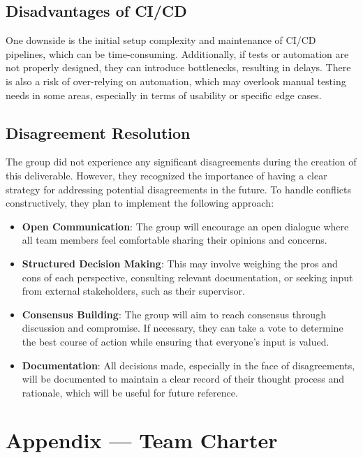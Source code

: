 \documentclass{article}
\begin{document}
\subsection*{Disadvantages of CI/CD}
One downside is the initial setup complexity and maintenance of CI/CD pipelines,
which can be time-consuming. Additionally, if tests or automation are not
properly designed, they can introduce bottlenecks, resulting in delays. There is
also a risk of over-relying on automation, which may overlook manual testing
needs in some areas, especially in terms of usability or specific edge cases.

\subsection*{Disagreement Resolution}
The group did not experience any significant disagreements during the creation
of this deliverable. However, they recognized the importance of having a clear
strategy for addressing potential disagreements in the future. To handle
conflicts constructively, they plan to implement the following approach:

\begin{itemize}
    \item \textbf{Open Communication}: The group will encourage an open dialogue
    where all team members feel comfortable sharing their opinions and concerns.
    \item \textbf{Structured Decision Making}: This may involve weighing the
    pros and cons of each perspective, consulting relevant documentation, or
    seeking input from external stakeholders, such as their supervisor.
    \item \textbf{Consensus Building}: The group will aim to reach consensus
    through discussion and compromise. If necessary, they can take a vote to
    determine the best course of action while ensuring that everyone’s input is
    valued.
    \item \textbf{Documentation}: All decisions made, especially in the face of
    disagreements, will be documented to maintain a clear record of their
    thought process and rationale, which will be useful for future reference.
\end{itemize}

\newpage{}

\section*{Appendix --- Team Charter}
\end{document}

